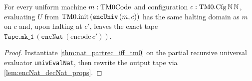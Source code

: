 \begin{theorem}
  \label{thm:U_evalCfg_tape}
  \leanok
  For every uniform machine $m : \mathrm{TM0Code}$ and configuration $c : \mathrm{TM0}.\mathrm{Cfg}\,\mathbb{N}\,\mathbb{N}$, evaluating $U$ from $\mathrm{TM0}.\mathrm{init}\,(\texttt{encUniv}\,(m, c))$ has the same halting domain as $m$ on $c$ and, upon halting at $c'$, leaves the exact tape $\texttt{Tape.mk\_1}\,(\texttt{encNat}\,(\mathrm{encode}\,c'))$.
\end{theorem}
\begin{proof}
  \leanok
  Instantiate \ref{thm:nat_partrec_iff_tm0} on the partial recursive universal evaluator \texttt{univEvalNat}, then rewrite the output tape via \ref{lem:encNat_decNat_props}.
\end{proof}
